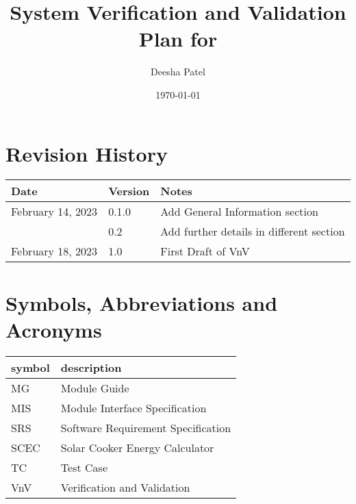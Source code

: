 \documentclass[12pt, titlepage]{article}
\begin{document}
\title{System Verification and Validation Plan for } 
\author{Deesha Patel}
\date{\today}
	
\maketitle


\section{Revision History}

\begin{tabularx}{\textwidth}{p{5cm}p{1.5cm}X}
\toprule {\bf Date} & {\bf Version} & {\bf Notes}\\
\midrule
February 14, 2023 & 0.1.0 & Add General Information section \\
& 0.2 & Add further details in different section \\

February 18, 2023 & 1.0 & First Draft of VnV \\

\bottomrule
\end{tabularx}

\newpage

\tableofcontents

\listoftables


\newpage

\section{Symbols, Abbreviations and Acronyms}

\renewcommand{\arraystretch}{1.2}
\begin{tabular}{l l} 
  \toprule		
  \textbf{symbol} & \textbf{description}\\
  \midrule 
  MG & Module Guide \\
  MIS & Module Interface Specification \\
  SRS & Software Requirement Specification\\
  SCEC & Solar Cooker Energy Calculator \\ 
  TC & Test Case \\
  VnV & Verification and Validation \\ 
  
  \bottomrule
\end{tabular}\\
\end{document}
